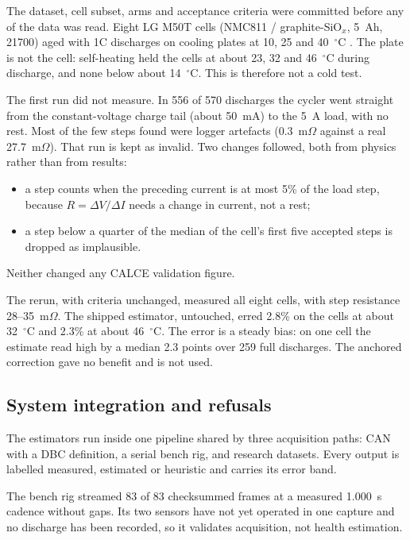 \documentclass[preprint,12pt,authoryear]{elsarticle}
\begin{document}
The dataset, cell subset, arms and acceptance criteria were committed before any
of the data was read. Eight LG M50T cells (NMC811 / graphite-SiO$_x$, 5~Ah,
21700) aged with 1C discharges on cooling plates at 10, 25 and
40~$^\circ$C \citep{kirkaldy2024}. The plate is not the cell: self-heating
held the cells at about 23, 32 and 46~$^\circ$C during discharge, and none
below about 14~$^\circ$C. This is therefore not a cold test.

The first run did not measure. In 556 of 570 discharges the cycler went straight
from the constant-voltage charge tail (about 50~mA) to the 5~A load, with no rest.
Most of the few steps found were logger artefacts (0.3~m$\Omega$ against a real
27.7~m$\Omega$). That run is kept as invalid. Two changes followed, both from
physics rather than from results:
\begin{itemize}
\item a step counts when the preceding current is at most 5\% of the load step,
because $R = \Delta V/\Delta I$ needs a change in current, not a rest;
\item a step below a quarter of the median of the cell's first five accepted
steps is dropped as implausible.
\end{itemize}
Neither changed any CALCE validation figure.

The rerun, with criteria unchanged, measured all eight cells, with step
resistance 28--35~m$\Omega$. The shipped estimator, untouched, erred 2.8\% on
the cells at about 32~$^\circ$C and 2.3\% at about 46~$^\circ$C. The error is a
steady bias: on one cell the estimate read high by a median 2.3 points over 259
full discharges. The anchored correction gave no benefit and is not used.

\subsection{System integration and refusals}
\label{sec:res-system}

The estimators run inside one pipeline shared by three acquisition paths: CAN
with a DBC definition, a serial bench rig, and research datasets. Every output
is labelled measured, estimated or heuristic and carries its error band.

The bench rig streamed 83 of 83 checksummed frames at a measured 1.000~s
cadence without gaps. Its two sensors have not yet operated in one capture and
no discharge has been recorded, so it validates acquisition, not health
estimation.
\end{document}
